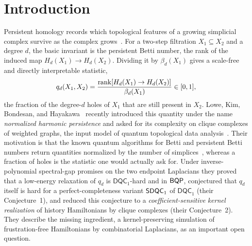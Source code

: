 \section{Introduction}
\label{sec:intro}

Persistent homology records which topological features of a growing simplicial complex survive as the complex grows~\cite{edelsbrunner2002topological,zomorodian2005computing,carlsson2009topology}. For a two-step filtration \(X_1\subseteq X_2\) and a degree \(d\), the basic invariant is the persistent Betti number, the rank of the induced map \(H_d(X_1)\to H_d(X_2)\). Dividing it by \(\beta_d(X_1)\) gives a scale-free and directly interpretable statistic,
\begin{equation}
\label{eq:intro-ratio}
q_d(X_1,X_2)=\frac{\operatorname{rank}[H_d(X_1)\to H_d(X_2)]}{\beta_d(X_1)}\in[0,1],
\end{equation}
the fraction of the degree-\(d\) holes of \(X_1\) that are still present in \(X_2\). Lowe, Kim, Bondesan, and Hayakawa~\cite{lowe2026normalized} recently introduced this quantity under the name \emph{normalized harmonic persistence} and asked for its complexity on clique complexes of weighted graphs, the input model of quantum topological data analysis~\cite{lloyd2016quantum,hayakawa2022quantum,gyurik2022towards,berry2024analyzing,mcardle2026streamlined}. Their motivation is that the known quantum algorithms for Betti and persistent Betti numbers return quantities normalized by the number of simplices~\cite{lloyd2016quantum,hayakawa2022quantum,schmidhuber2023limitations,apers2023simple}, whereas a fraction of holes is the statistic one would actually ask for. Under inverse-polynomial spectral-gap promises on the two endpoint Laplacians they proved that a low-energy relaxation of \(q_d\) is \(\mathsf{DQC}_1\)-hard and in \(\mathsf{BQP}\), conjectured that \(q_d\) itself is hard for a perfect-completeness variant \(\mathsf{SDQC}_{1}\) of \(\mathsf{DQC}_1\) (their Conjecture~1), and reduced this conjecture to a \emph{coefficient-sensitive kernel realization} of history Hamiltonians by clique complexes (their Conjecture~2). They describe the missing ingredient, a kernel-preserving simulation of frustration-free Hamiltonians by combinatorial Laplacians, as an important open question.

